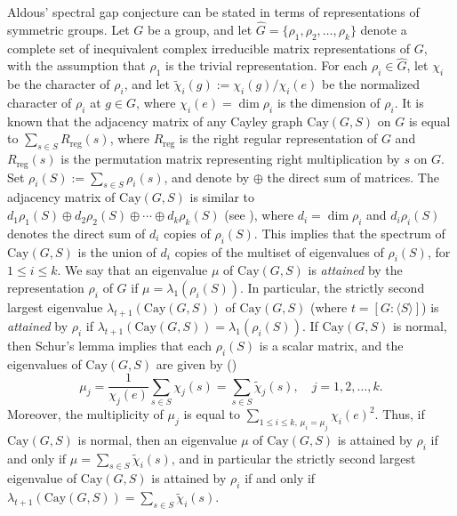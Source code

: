\documentclass[12pt, a4paper]{article}
\theoremstyle{definition}
\begin{document}
Aldous' spectral gap conjecture can be stated in terms of representations of symmetric groups. Let $G$ be a group, and let $\widehat{G}=\{\rho_1,\rho_2,\ldots,\rho_k\}$ denote a complete set of inequivalent complex irreducible matrix representations of $G$, with the assumption that $\rho_1$ is the trivial representation. For each $\rho_i \in \widehat{G}$, let $\chi_i$ be the character of $\rho_i$, and let $\tilde{\chi}_i(g):=\chi_i(g)/\chi_i(e)$
be the normalized character of $\rho_i$ at $g\in G$, where $\chi_i(e) = \dim\rho_i$ is the dimension of $\rho_i$. It is known \cite{MS} that the adjacency matrix of any Cayley graph $\mathrm{Cay}(G, S)$ on $G$ is equal to $\sum_{s\in S} R_{\mathrm{reg}}(s)$, where $R_{\mathrm{reg}}$ is the right regular representation of $G$ and $R_{\mathrm{reg}}(s)$ is the permutation matrix representing right multiplication by $s$ on $G$. Set
$\rho_i(S) := \sum_{s \in S} \rho_i(s)$,
and denote by $\oplus$ the direct sum of matrices. The adjacency matrix of $\mathrm{Cay}(G,S)$ is similar to
$d_1\rho_1(S)\oplus d_2\rho_2(S)\oplus \cdots\oplus d_k\rho_k(S)$
(see \cite[Proposition 7.1]{MS}), where $d_i=\dim\rho_i$ and $d_i\rho_i(S)$ denotes the direct sum of $d_i$ copies of $\rho_i(S)$.
This implies that the spectrum of $\mathrm{Cay}(G,S)$ is the union of $d_i$ copies of the multiset of eigenvalues of $\rho_i(S)$, for $1\leq i\leq k$. We say that an eigenvalue $\mu$ of $\mathrm{Cay}(G,S)$ is \emph{attained} \cite{LXZ} by the representation $\rho_i$ of $G$ if $\mu=\lambda_1(\rho_i(S))$. In particular, the strictly second largest eigenvalue $\lambda_{t+1}(\mathrm{Cay}(G,S))$ of $\mathrm{Cay}(G,S)$ (where $t = [G:\langle S \rangle]$) is \emph{attained} by $\rho_i$ if
$\lambda_{t+1}(\mathrm{Cay}(G,S))=\lambda_1(\rho_i(S))$.
If $\mathrm{Cay}(G,S)$ is normal, then Schur's lemma implies that each $\rho_i(S)$ is a scalar matrix, and the eigenvalues of $\mathrm{Cay}(G,S)$ are given by (\cite{DS,Z})
\begin{equation}
\label{eq:muj}
\mu_j=\frac{1}{\chi_j(e)}\sum_{s\in S}\chi_j(s)=\sum_{s\in S}\tilde{\chi}_j(s),\quad j=1,2,\ldots,k.
\end{equation}
Moreover, the multiplicity of $\mu_j$ is equal to $\sum_{1\leq i\leq k,\, \mu_i=\mu_j}\chi_i(e)^2$. Thus, if $\mathrm{Cay}(G,S)$ is normal, then an eigenvalue $\mu$ of $\mathrm{Cay}(G,S)$ is attained by $\rho_i$ if and only if $\mu = \sum_{s\in S} \tilde{\chi}_i(s)$, and in particular the strictly second largest eigenvalue of $\mathrm{Cay}(G,S)$ is attained by $\rho_i$ if and only if $\lambda_{t+1}(\mathrm{Cay}(G,S))=\sum_{s\in S} \tilde{\chi}_i(s)$.
\end{document}
